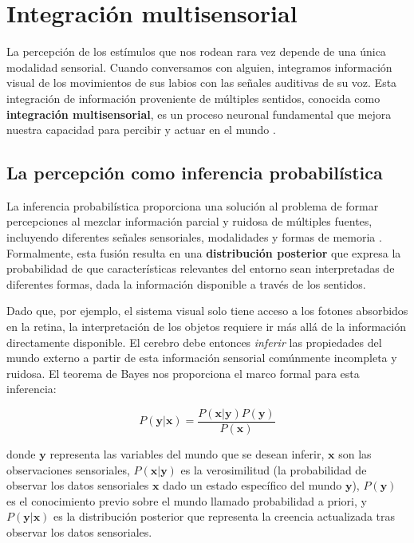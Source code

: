 \section{Integración multisensorial}
\label{sec:integracion_multisensorial}

La percepción de los estímulos que nos rodean rara vez depende de una única modalidad sensorial. Cuando conversamos con alguien, integramos información visual de los movimientos de sus labios con las señales auditivas de su voz. Esta integración de información proveniente de múltiples sentidos, conocida como \textbf{integración multisensorial}, es un proceso neuronal fundamental que mejora nuestra capacidad para percibir y actuar en el mundo \citep{stein2012new}.


\subsection{La percepción como inferencia probabilística}
\label{subsec:percepcion_bayesiana}

La inferencia probabilística proporciona una solución al problema de formar percepciones al mezclar información parcial y ruidosa de múltiples fuentes, incluyendo diferentes señales sensoriales, modalidades y formas de memoria \citep{echeveste2020cortical}. Formalmente, esta fusión resulta en una \textbf{distribución posterior} que expresa la probabilidad de que características relevantes del entorno sean interpretadas de diferentes formas, dada la información disponible a través de los sentidos.

Dado que, por ejemplo, el sistema visual solo tiene acceso a los fotones absorbidos en la retina, la interpretación de los objetos requiere ir más allá de la información directamente disponible. El cerebro debe entonces \textit{inferir} las propiedades del mundo externo a partir de esta información sensorial comúnmente incompleta y ruidosa. El teorema de Bayes nos proporciona el marco formal para esta inferencia:

\begin{equation}
P(\mathbf{y}|\mathbf{x}) = \frac{P(\mathbf{x}|\mathbf{y})P(\mathbf{y})}{P(\mathbf{x})}
\label{eq:bayes_perception}
\end{equation}

donde $\mathbf{y}$ representa las variables del mundo que se desean inferir, $\mathbf{x}$ son las observaciones sensoriales, $P(\mathbf{x}|\mathbf{y})$ es la verosimilitud (la probabilidad de observar los datos sensoriales $\mathbf{x}$ dado un estado específico del mundo $\mathbf{y}$), $P(\mathbf{y})$ es el conocimiento previo sobre el mundo llamado probabilidad a priori, y $P(\mathbf{y}|\mathbf{x})$ es la distribución posterior que representa la creencia actualizada tras observar los datos sensoriales.

